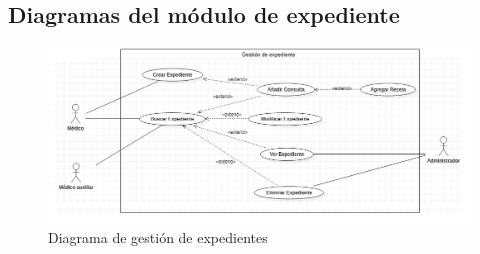 \documentclass[12pt,letterpaper]{article}
\begin{document}
        \newpage
        \subsection{Diagramas del módulo de expediente}
            \begin{figure}[H]
                \centering
                \includegraphics [scale=0.5]{casosUso/gestionExpediente}
                \caption{Diagrama de gestión de expedientes}
            \end{figure}
            \vfill
            
\end{document}

